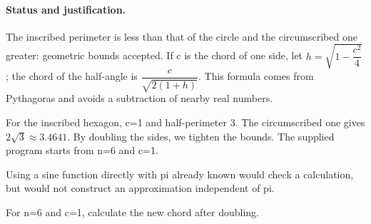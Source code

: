\paragraph{Status and justification.} The inscribed perimeter is less than that of the circle and the circumscribed one greater: geometric bounds accepted. If c is the chord of one side, let $h=\sqrt {1-\dfrac{c^2}{4}}$; the chord of the half-angle is $\dfrac{c}{\sqrt {2(1+h)}}$. This formula comes from Pythagoras and avoids a subtraction of nearby real numbers.
\begin{example}For the inscribed hexagon, c=1 and half-perimeter 3. The circumscribed one gives $2\sqrt3\approx\num{3,4641}$. By doubling the sides, we tighten the bounds. The supplied program starts from n=6 and c=1.\end{example}\label{C10-EX5}
\begin{pitfall}Using a sine function directly with pi already known would check a calculation, but would not construct an approximation independent of pi.\end{pitfall}
\begin{application}For n=6 and c=1, calculate the new chord after doubling.\end{application}\label{C10-AP5}
\mxnewpage
